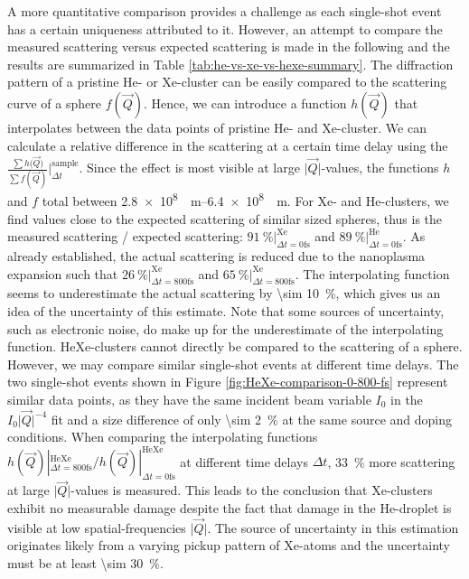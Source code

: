 A more quantitative comparison provides a challenge as each single-shot event has a certain uniqueness attributed to it. However, an attempt to compare the measured scattering versus expected scattering is made in the following and the results are summarized in Table \ref{tab:he-vs-xe-vs-hexe-summary}. The diffraction pattern of a pristine He- or Xe-cluster can be easily compared to the scattering curve of a sphere $f(\vec{Q})$. Hence, we can introduce a function $h(\vec{Q})$ that interpolates between the data points of pristine He- and Xe-cluster. We can calculate a relative difference in the scattering at a certain time delay using the $\tfrac{\sum{h(\vec{Q}})}{\sum{f(\vec{Q})}}|_{\Delta t}^{\text{sample}}$. Since the effect is most visible at large $\lvert\vec{Q}\rvert$-values, the functions $h$ and $f$ total between \SIrange[scientific-notation = fixed, fixed-exponent = 8]{2.8e8}{6.4e8}{\per\meter}. For Xe- and He-clusters, we find values close to the expected scattering of similar sized spheres, thus is the measured scattering / expected scattering: $\SI{91}{\percent} |_{\Delta t = 0 \text{fs}}^{\text{Xe}}$ and $\SI{89}{\percent}|_{\Delta t=0 \text{fs}}^{\text{He}}$. As already established, the actual scattering is reduced due to the nanoplasma expansion such that $\SI{26}{\percent} |_{\Delta t = 800 \text{fs}}^{\text{Xe}}$ and $\SI{65}{\percent} |_{\Delta t = 800 \text{fs}}^{\text{Xe}}$. The interpolating function seems to underestimate the actual scattering by \SI{\sim 10}{\percent}, which gives us an idea of the uncertainty of this estimate. Note that some sources of uncertainty, such as electronic noise, do make up for the underestimate of the interpolating function. HeXe-clusters cannot directly be compared to the scattering of a sphere. However, we may compare similar single-shot events at different time delays. The two single-shot events shown in Figure \ref{fig:HeXe-comparison-0-800-fs} represent similar data points, as they have the same incident beam variable $I_{0}$ in the $I_{0} \lvert\vec{Q}\rvert^{-4}$ fit and a size difference of only \SI{\sim 2}{\percent} at the same source and doping conditions. When comparing the interpolating functions $h(\vec{Q}) |_{\Delta t = 800 \text{fs}}^{\text{HeXe}}/h(\vec{Q}) |_{\Delta t = 0 \text{fs}}^{\text{HeXe}}$ at different time delays $\Delta t$, \SI{33}{\percent} more scattering at large $\lvert\vec{Q}\rvert$-values is measured. This leads to the conclusion that Xe-clusters exhibit no measurable damage despite the fact that damage in the He-droplet is visible at low spatial-frequencies $\lvert\vec{Q}\rvert$. The source of uncertainty in this estimation originates likely from a varying pickup pattern of Xe-atoms and the uncertainty must be at least \SI{\sim 30}{\percent}.\\[1\baselineskip]
